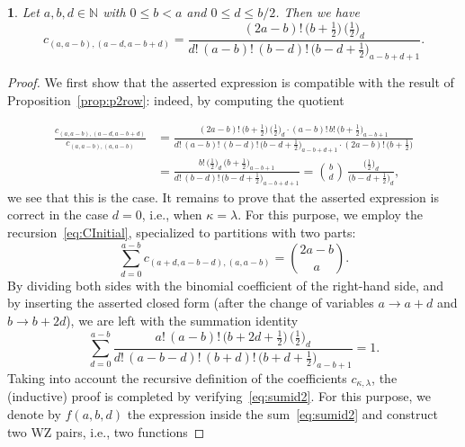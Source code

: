 \documentclass{mathincs}
\numberwithin{equation}{section}
\numberwithin{figure}{section}
\theoremstyle{plain}
\newtheorem{thm}{\protect\theoremname}[section]
\theoremstyle{definition}
\theoremstyle{remark}
\theoremstyle{plain}
\theoremstyle{definition}
\theoremstyle{plain}
\theoremstyle{plain}
\providecommand{\theoremname}{Theorem}
\begin{document}
\begin{thm}\label{thm:cf2}
  Let $a,b,d\in\mathbb{N}$ with $0\leq b<a$ and $0\leq d\leq b/2$.
  Then we have
  \[
    c_{(a,a-b),(a-d,a-b+d)} = 
    \frac{(2a-b)! \, \bigl(b+\frac12\bigr) \, \bigl(\frac12\bigr)_{\!d}}
         {d! \, (a-b)! \, (b-d)! \, \bigl(b-d+\frac12\bigr)_{\!a-b+d+1}}.
  \]
\end{thm}
\begin{proof}
  We first show that the asserted expression is compatible with the result of
  Proposition~\ref{prop:p2row}: indeed, by computing the quotient
  
  \begin{align*}
    \frac{c_{(a,a-b),(a-d,a-b+d)}}{c_{(a,a-b),(a,a-b)}} &=
    \frac{(2a-b)! \, \bigl(b+\frac12\bigr) \, \bigl(\frac12\bigr)_{\!d} \cdot
      (a-b)! \, b! \, \bigl(b+\frac12\bigr)_{\!a-b+1}}
      {d! \, (a-b)! \, (b-d)! \, \bigl(b-d+\frac12\bigr)_{\!a-b+d+1} \cdot
        (2a-b)! \, \bigl(b+\frac12\bigr)} \\
    &= \frac{b! \, \bigl(\frac12\bigr)_{\!d} \, \bigl(b+\frac12\bigr)_{\!a-b+1}}
      {d! \, (b-d)! \, \bigl(b-d+\frac12\bigr)_{\!a-b+d+1}}
    = \binom{b}{d}\,\frac{\bigl(\frac12\bigr)_{\!d}}{\bigl(b-d+\frac12\bigr)_{\!d}},
  \end{align*}
  we see that this is the case. It remains to prove that the asserted
  expression is correct in the case $d=0$, i.e., when $\kappa=\lambda$.  For
  this purpose, we employ the recursion~\eqref{eq:CInitial}, specialized to
  partitions with two parts:
  \begin{equation}\label{eq:CInitial2}
    \sum_{d=0}^{a-b} c_{(a+d,a-b-d),(a,a-b)} = \binom{2a-b}{a}.
  \end{equation}
  By dividing both sides with the binomial coefficient of the right-hand side,
  and by inserting the asserted closed form (after the change of variables
  $a\to a+d$ and $b\to b+2d$), we are left with the summation identity
  \begin{equation}\label{eq:sumid2}
    \sum_{d=0}^{a-b}
    \frac{a! \, (a-b)! \, \bigl(b+2d+\frac{1}{2}\bigr) \, \bigl(\frac{1}{2}\bigr)_{\!d}}
         {d! \, (a-b-d)! \, (b+d)! \, \bigl(b+d+\frac12\bigr)_{\!a-b+1}} = 1.
  \end{equation}
  Taking into account the recursive definition of the coefficients
  $c_{\kappa,\lambda}$, the (inductive) proof is completed by
  verifying~\eqref{eq:sumid2}.
  For this purpose, we denote by $f(a,b,d)$ the expression inside the
  sum~\eqref{eq:sumid2} and construct two WZ pairs, i.e., two functions

\end{proof}
\end{document}
